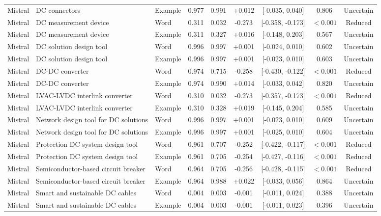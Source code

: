 \begin{landscape}
\begin{longtable}{lllcccccc}
Mistral & DC connectors & Example & 0.977 & 0.991 & +0.012 & [-0.035, 0.040] & 0.806 & Uncertain \\
Mistral & DC measurement device & Word & 0.311 & 0.032 & -0.273 & [-0.358, -0.173] & $<0.001$ & Reduced \\
Mistral & DC measurement device & Example & 0.311 & 0.327 & +0.016 & [-0.148, 0.203] & 0.567 & Uncertain \\
Mistral & DC solution design tool & Word & 0.996 & 0.997 & +0.001 & [-0.024, 0.010] & 0.602 & Uncertain \\
Mistral & DC solution design tool & Example & 0.996 & 0.997 & +0.001 & [-0.023, 0.010] & 0.603 & Uncertain \\
Mistral & DC-DC converter & Word & 0.974 & 0.715 & -0.258 & [-0.430, -0.122] & $<0.001$ & Reduced \\
Mistral & DC-DC converter & Example & 0.974 & 0.990 & +0.014 & [-0.033, 0.042] & 0.820 & Uncertain \\
Mistral & LVAC-LVDC interlink converter & Word & 0.310 & 0.032 & -0.273 & [-0.357, -0.173] & $<0.001$ & Reduced \\
Mistral & LVAC-LVDC interlink converter & Example & 0.310 & 0.328 & +0.019 & [-0.145, 0.204] & 0.585 & Uncertain \\
Mistral & Network design tool for DC solutions & Word & 0.996 & 0.997 & +0.001 & [-0.023, 0.010] & 0.609 & Uncertain \\
Mistral & Network design tool for DC solutions & Example & 0.996 & 0.997 & +0.001 & [-0.025, 0.010] & 0.604 & Uncertain \\
Mistral & Protection DC system design tool & Word & 0.961 & 0.707 & -0.252 & [-0.422, -0.117] & $<0.001$ & Reduced \\
Mistral & Protection DC system design tool & Example & 0.961 & 0.705 & -0.254 & [-0.427, -0.116] & $<0.001$ & Reduced \\
Mistral & Semiconductor-based circuit breaker & Word & 0.964 & 0.705 & -0.256 & [-0.428, -0.115] & $<0.001$ & Reduced \\
Mistral & Semiconductor-based circuit breaker & Example & 0.964 & 0.988 & +0.022 & [-0.033, 0.056] & 0.864 & Uncertain \\
Mistral & Smart and sustainable DC cables & Word & 0.004 & 0.003 & -0.001 & [-0.011, 0.024] & 0.388 & Uncertain \\
Mistral & Smart and sustainable DC cables & Example & 0.004 & 0.003 & -0.001 & [-0.011, 0.023] & 0.396 & Uncertain \\

\end{longtable}
\end{landscape}
